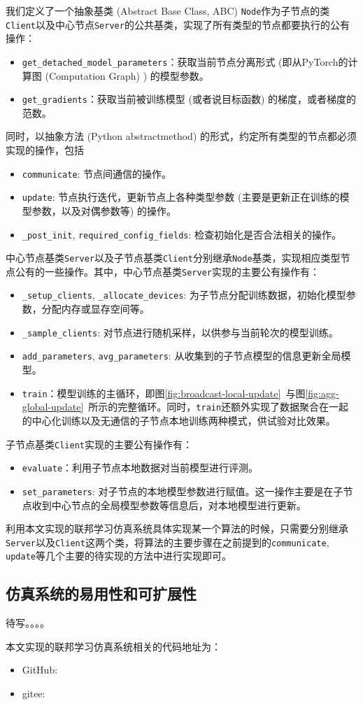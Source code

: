 我们定义了一个抽象基类 (Abstract Base Class, ABC) \texttt{Node}作为子节点的类\texttt{Client}以及中心节点\texttt{Server}的公共基类，实现了所有类型的节点都要执行的公有操作：
\begin{itemize}
    \item \texttt{get\_detached\_model\_parameters}：获取当前节点分离形式 (即从PyTorch的计算图 (Computation Graph) ) 的模型参数。
    \item \texttt{get\_gradients}：获取当前被训练模型 (或者说目标函数) 的梯度，或者梯度的范数。
\end{itemize}
同时，以抽象方法 (Python abstractmethod) 的形式，约定所有类型的节点都必须实现的操作，包括
\begin{itemize}
    \item \texttt{communicate}: 节点间通信的操作。
    \item \texttt{update}: 节点执行迭代，更新节点上各种类型参数 (主要是更新正在训练的模型参数，以及对偶参数等) 的操作。
    \item \texttt{\_post\_init}, \texttt{required\_config\_fields}: 检查初始化是否合法相关的操作。
\end{itemize}

中心节点基类\texttt{Server}以及子节点基类\texttt{Client}分别继承\texttt{Node}基类，实现相应类型节点公有的一些操作。其中，中心节点基类\texttt{Server}实现的主要公有操作有：
\begin{itemize}
    \item \texttt{\_setup\_clients}, \texttt{\_allocate\_devices}: 为子节点分配训练数据，初始化模型参数，分配内存或显存空间等。
    \item \texttt{\_sample\_clients}: 对节点进行随机采样，以供参与当前轮次的模型训练。
    \item \texttt{add\_parameters}, \texttt{avg\_parameters}: 从收集到的子节点模型的信息更新全局模型。
    \item \texttt{train}：模型训练的主循环，即图\ref{fig:broadcast-local-update}~与图\ref{fig:agg-global-update}~所示的完整循环。同时，\texttt{train}还额外实现了数据聚合在一起的中心化训练以及无通信的子节点本地训练两种模式，供试验对比效果。
\end{itemize}
子节点基类\texttt{Client}实现的主要公有操作有：
\begin{itemize}
    \item \texttt{evaluate}：利用子节点本地数据对当前模型进行评测。
    \item \texttt{set\_parameters}: 对子节点的本地模型参数进行赋值。这一操作主要是在子节点收到中心节点的全局模型参数等信息后，对本地模型进行更新。
\end{itemize}
利用本文实现的联邦学习仿真系统具体实现某一个算法的时候，只需要分别继承\texttt{Server}以及\texttt{Client}这两个类，将算法的主要步骤在之前提到的\texttt{communicate}, \texttt{update}等几个主要的待实现的方法中进行实现即可。

\subsection{仿真系统的易用性和可扩展性}

待写。。。。

本文实现的联邦学习仿真系统相关的代码地址为：
\begin{itemize}
    \item GitHub: \urlgithub
    \item gitee: \urlgitee
\end{itemize}
